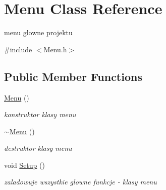 \hypertarget{class_menu}{}\section{Menu Class Reference}
\label{class_menu}


menu glowne projektu  




{\ttfamily \#include $<$Menu.\+h$>$}

\subsection*{Public Member Functions}
\begin{DoxyCompactItemize}
\item 
\mbox{\label{class_menu_ad466dd83355124a6ed958430450bfe94}} 
\mbox{\hyperlink{class_menu_ad466dd83355124a6ed958430450bfe94}{Menu}} ()
\begin{DoxyCompactList}\small\item\em konstruktor klasy menu \end{DoxyCompactList}\item 
\mbox{\label{class_menu_a831387f51358cfb88cd018e1777bc980}} 
\mbox{\hyperlink{class_menu_a831387f51358cfb88cd018e1777bc980}{$\sim$\+Menu}} ()
\begin{DoxyCompactList}\small\item\em destruktor klasy menu \end{DoxyCompactList}\item 
\mbox{\label{class_menu_ab9e9fa4e003d3508fcfcf57e05ea33b7}} 
void \mbox{\hyperlink{class_menu_ab9e9fa4e003d3508fcfcf57e05ea33b7}{Setup}} ()
\begin{DoxyCompactList}\small\item\em zaladowuje wszystkie glowne funkcje -\/ klasy menu \end{DoxyCompactList}\end{DoxyCompactItemize}
